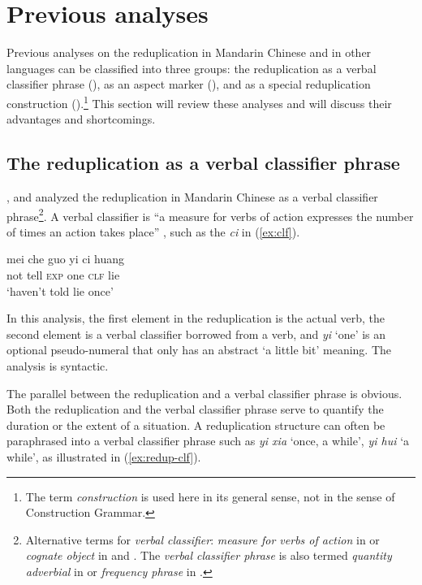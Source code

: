 \section{Previous analyses}\label{sec:prev}

Previous analyses on the reduplication in Mandarin Chinese and in other languages can be classified
into three groups:  the reduplication as a verbal classifier phrase (), as an aspect marker (), and
as a special reduplication construction ().\footnote{The term \textit{construction} is used here in its general sense, not in the sense of Construction Grammar.} 
This section will review these analyses and will discuss their advantages and shortcomings.



\subsection{The reduplication as a verbal classifier phrase}\label{sec:clf}

\citet{Fan1964}, \citet{Chao1968} and \citet{Xiong2016} analyzed the reduplication in Mandarin Chinese
as a verbal classifier phrase\footnote{Alternative terms for \textit{verbal classifier}: \textit{measure for verbs of action} in \citet[615]{Chao1968} or \textit{cognate object} in \citet[312]{Chao1968} and  \citet[263]{Hong1999}.
The \textit{verbal classifier phrase}  is also termed \textit{quantity adverbial} in \citet[352--353]{LiThompson1981} or \textit{frequency phrase} in \citet[91]{Huangetal2009}.}.
A verbal classifier is ``a measure for verbs of action expresses the number of times an action takes place” \citep[615]{Chao1968}, such as the \textit{ci} in (\ref{ex:clf}). 

\ea\label{ex:clf}
\gll mei che guo yi ci huang\\
not tell \textsc{exp} one \textsc{clf} lie\\ \hfill {\citep[616]{Chao1968}}
\glt `haven't told lie once'
\z

In this analysis, the first element in the reduplication is the actual verb, 
the second element is a verbal classifier borrowed from a verb, 
and \textit{yi} `one' is an optional pseudo-numeral that only has an abstract `a little bit' meaning.
The analysis is syntactic.

The parallel between the reduplication and a verbal classifier phrase is obvious. 
Both the reduplication and the verbal classifier phrase serve to quantify the duration or the extent of a situation. 
A reduplication structure can often be paraphrased into a verbal classifier phrase such as \textit{yi xia} ‘once, a while’, \textit{yi hui} ‘a while’, as illustrated in (\ref{ex:redup-clf}).

